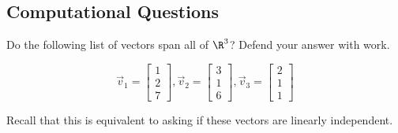 \documentclass[12pt,addpoints,answers]{exam}
\begin{document}
\begin{questions}

        \section*{Computational Questions}
        \question[15] Do the following list of vectors span all of $\R^3$? Defend your answer with work.

        \[
            \vec{v}_1 = \begin{bmatrix}
                1\\2\\7
            \end{bmatrix}, \vec{v}_2 = \begin{bmatrix}
                3 \\ 1 \\ 6
            \end{bmatrix}, \vec{v}_3 = \begin{bmatrix}
                2 \\ 1\\ 1
            \end{bmatrix}
        \]
        \begin{solution}
            Recall that this is equivalent to asking if these vectors are linearly independent.


\end{solution}
\end{questions}
\end{document}
